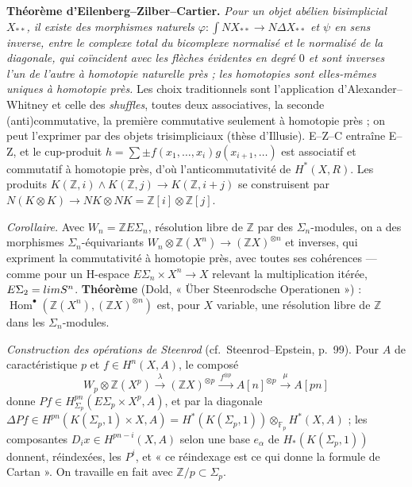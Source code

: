 \documentclass[11pt,a4paper]{article}
\begin{document}
\textbf{Théorème d'Eilenberg–Zilber–Cartier.} \emph{Pour un objet abélien
bisimplicial $X_{**}$, il existe des morphismes naturels $\varphi : \int
N X_{**} \to N\Delta X_{**}$ et $\psi$ en sens inverse, entre le complexe total
du bicomplexe normalisé et le normalisé de la diagonale, qui coïncident avec
les flèches évidentes en degré $0$ et sont inverses l'un de l'autre à homotopie
naturelle près ; les homotopies sont elles-mêmes uniques à homotopie près.} Les
choix traditionnels sont l'application d'Alexander–Whitney et celle des
\emph{shuffles}, toutes deux associatives, la seconde (anti)commutative, la
première commutative seulement à homotopie près ; on peut l'exprimer par des
objets trisimpliciaux (thèse d'Illusie). E–Z–C entraîne E–Z, et le
cup-produit $h = \sum \pm f(x_1,\ldots,x_i)g(x_{i+1},\ldots)$ est associatif et
commutatif à homotopie près, d'où l'anticommutativité de $H^*(X, R)$. Les
produits $K(\mathbb{Z},i) \wedge K(\mathbb{Z}, j) \to K(\mathbb{Z}, i+j)$ se
construisent par $N(K \otimes K) \to NK \otimes NK = \mathbb{Z}[i] \otimes
\mathbb{Z}[j]$.

\emph{Corollaire.} Avec $W_n = \mathbb{Z}E\Sigma_n$, résolution libre de
$\mathbb{Z}$ par des $\Sigma_n$-modules, on a des morphismes $\Sigma_n$-équivariants
$W_n \otimes \mathbb{Z}(X^n) \to (\mathbb{Z}X)^{\otimes n}$ et inverses, qui
expriment la commutativité à homotopie près, avec toutes ses cohérences — comme
pour un H-espace $E\Sigma_n \times X^n \to X$ relevant la multiplication itérée,
$E\Sigma_2 = \varinjlim S^n$. \textbf{Théorème} (Dold, « Über Steenrodsche
Operationen ») : $\operatorname{Hom}^\bullet(\mathbb{Z}(X^n), (\mathbb{Z}X)^{\otimes
n})$ est, pour $X$ variable, une résolution libre de $\mathbb{Z}$ dans les
$\Sigma_n$-modules.

\emph{Construction des opérations de Steenrod} (cf.\ Steenrod–Epstein, p.~99).
Pour $A$ de caractéristique $p$ et $f \in H^n(X, A)$, le composé
\[
W_p \otimes \mathbb{Z}(X^p) \xrightarrow{\ \lambda\ } (\mathbb{Z}X)^{\otimes p} \xrightarrow{\ f^{\otimes p}\ } A[n]^{\otimes p} \xrightarrow{\ \mu\ } A[pn]
\]
donne $Pf \in H^{pn}_{\Sigma_p}(E\Sigma_p \times X^p, A)$, et par la diagonale
$\Delta Pf \in H^{pn}(K(\Sigma_p,1) \times X, A) = H^*(K(\Sigma_p,1))
\otimes_{\mathbb{F}_p} H^*(X, A)$ ; les composantes $D_ix \in H^{pn-i}(X,A)$
selon une base $e_\alpha$ de $H_*(K(\Sigma_p, 1))$ donnent, réindexées, les
$P^i$, et « ce réindexage est ce qui donne la formule de Cartan ». On travaille
en fait avec $\mathbb{Z}/p \subset \Sigma_p$.

\end{document}
